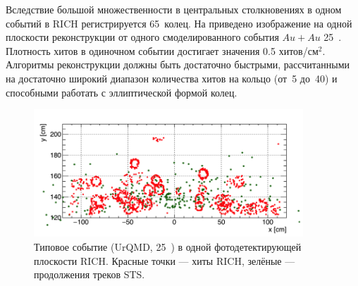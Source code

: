 \begin{minipage}[t]{0.495\textwidth}
Вследствие большой множественности в центральных столкновениях в одном событий в RICH регистрируется 65~колец.
На  приведено изображение на одной плоскости реконструкции от одного смоделированного события $Au+Au$ 25~\GeVperNucl{}. Плотность хитов в одиночном событии достигает значения 0.5 хитов/см$^{2}$. Алгоритмы реконструкции должны быть достаточно быстрыми, рассчитанными на достаточно широкий диапазон количества хитов на кольцо (от~5 до~40) и способными работать с эллиптической формой колец.
\end{minipage}

\begin{figure}[H]
\includegraphics[width=0.9\textwidth]{pictures/CbmRichOneEvent.png}
\caption{Типовое событие (UrQMD, 25~\GeVperNucl{}) в одной фотодетектирующей плоскости RICH. Красные точки --- хиты RICH, зелёные --- продолжения треков STS.}
\label{fig:CbmRichOneEvent}
\end{figure}

